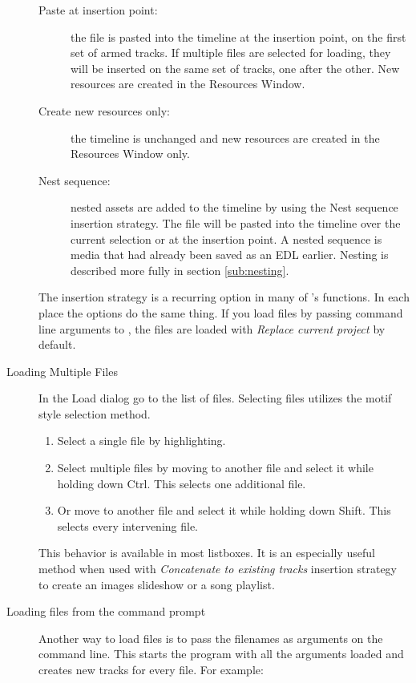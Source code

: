 \begin{description}
\begin{description}
        \item[Paste at insertion point:] the file is pasted into the timeline at the insertion point, on the first set of armed tracks.  If multiple files are selected for loading, they will be inserted on the same set of tracks, one after the other. New resources are created in the Resources Window.
        \item[Create new resources only:] the timeline is unchanged and new resources are created in the Resources Window only.
        \item[Nest sequence:] nested assets are added to the timeline by using the Nest sequence insertion strategy.
        The file will be pasted into the timeline over the current selection or at the insertion point. A nested sequence is media that had already been saved as an EDL earlier.  Nesting is described more fully in section \ref{sub:nesting}.
    \end{description}
    The insertion strategy is a recurring option in many of \CGG{}'s functions. In each place the options do the same thing. If you load files by passing command line arguments to \CGG{}, the files are loaded with \textit{Replace current project} by default.
    \item[Loading Multiple Files] In the Load dialog go to the list of files. Selecting files utilizes the motif style selection method.
    \begin{enumerate} [noitemsep]
        \item Select a single file by highlighting.
        \item Select multiple files by moving to another file and select it while holding down Ctrl. This selects
        one additional file.
        \item Or move to another file and select it while holding down Shift. This selects every intervening file.
    \end{enumerate}
This behavior is available in most listboxes.   It is an especially useful method when used with \textit{Concatenate to existing tracks} insertion strategy to create an images slideshow or a song playlist.
    \item[Loading files from the command prompt] Another way to load files is to pass the filenames as arguments on the command line.  This starts the program with all the arguments loaded and creates new tracks for every file.  For example:
    

\end{description}
